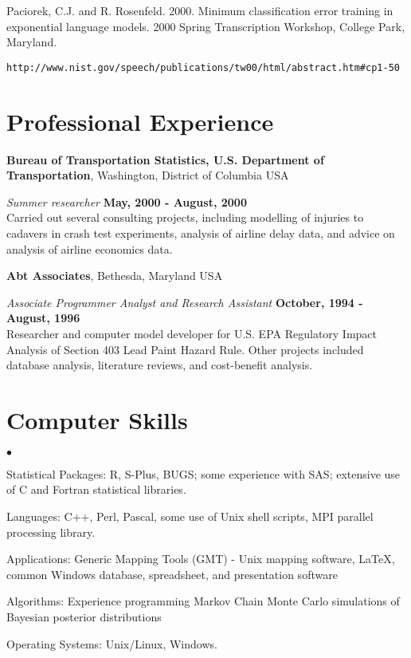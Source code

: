 \documentclass[margin,line]{res}
\newenvironment{list2}{
  \begin{list}{$\bullet$}{%
      \setlength{\itemsep}{0in}
      \setlength{\parsep}{0in} \setlength{\parskip}{0in}
      \setlength{\topsep}{0in} \setlength{\partopsep}{0in} 
      \setlength{\leftmargin}{0.2in}}}{\end{list}}
\begin{document}
\begin{resume}
Paciorek, C.J. and R. Rosenfeld.  2000.  Minimum classification error
training in exponential language models.  2000 Spring Transcription
Workshop, College Park, Maryland.
\vspace*{-.25in}  
\begin{verbatim}http://www.nist.gov/speech/publications/tw00/html/abstract.htm#cp1-50\end{verbatim}

\section{\sc Professional Experience}
{\bf Bureau of Transportation Statistics, U.S. Department of
  Transportation}, Washington, District of Columbia USA

\vspace{-.3cm}
{\em Summer researcher} \hfill {\bf May, 2000 - August, 2000}\\
Carried out several consulting projects, including modelling of
injuries to cadavers in crash test experiments, analysis of airline
delay data, and advice on analysis of airline economics data.

{\bf Abt Associates}, Bethesda, Maryland USA

\vspace{-.3cm}
{\em Associate Programmer Analyst and Research Assistant} \hfill {\bf
  October, 1994 - August, 1996}\\
Researcher and computer model developer for U.S. EPA Regulatory Impact
Analysis of Section 403 Lead Paint Hazard Rule.  Other projects
included database analysis, literature reviews, and cost-benefit analysis.

\section{\sc Computer Skills} 
\begin{list2}
\item Statistical Packages:  R, S-Plus, BUGS; some experience
  with SAS; extensive use of C and Fortran statistical libraries.
\item Languages:  C++, Perl, Pascal, some use of Unix shell scripts,
  MPI parallel processing library.
\item Applications: Generic Mapping Tools (GMT) - Unix mapping software, \LaTeX, common Windows
  database, spreadsheet, and presentation software
\item Algorithms: Experience programming Markov Chain Monte Carlo
  simulations of Bayesian posterior distributions
\item Operating Systems:  Unix/Linux, Windows.\\ 
\end{list2}



\end{resume}
\end{document}
